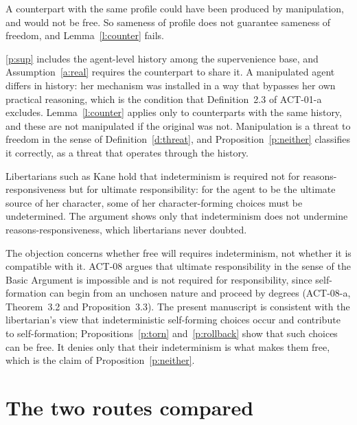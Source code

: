 \documentclass{situationist-preprint}
\begin{document}
\begin{objection}\label{o:manip}
A counterpart with the same profile could have been produced by manipulation, and would not be free. So sameness of profile does not guarantee sameness of freedom, and Lemma~\ref{l:counter} fails.
\end{objection}

\begin{reply}
\ref{p:sup} includes the agent-level history among the supervenience base, and Assumption~\ref{a:real} requires the counterpart to share it. A manipulated agent differs in history: her mechanism was installed in a way that bypasses her own practical reasoning, which is the condition that Definition~2.3 of ACT-01-a excludes. Lemma~\ref{l:counter} applies only to counterparts with the same history, and these are not manipulated if the original was not. Manipulation is a threat to freedom in the sense of Definition~\ref{d:threat}, and Proposition~\ref{p:neither} classifies it correctly, as a threat that operates through the history.
\end{reply}

\begin{objection}\label{o:ur}
Libertarians such as Kane hold that indeterminism is required not for reasons-responsiveness but for ultimate responsibility: for the agent to be the ultimate source of her character, some of her character-forming choices must be undetermined. The argument shows only that indeterminism does not undermine reasons-responsiveness, which libertarians never doubted.
\end{objection}

\begin{reply}
The objection concerns whether free will requires indeterminism, not whether it is compatible with it. ACT-08 argues that ultimate responsibility in the sense of the Basic Argument is impossible and is not required for responsibility, since self-formation can begin from an unchosen nature and proceed by degrees (ACT-08-a, Theorem~3.2 and Proposition~3.3). The present manuscript is consistent with the libertarian's view that indeterministic self-forming choices occur and contribute to self-formation; Propositions~\ref{p:torn} and~\ref{p:rollback} show that such choices can be free. It denies only that their indeterminism is what makes them free, which is the claim of Proposition~\ref{p:neither}.
\end{reply}

\section{The two routes compared}\label{s:compare}
\end{document}
